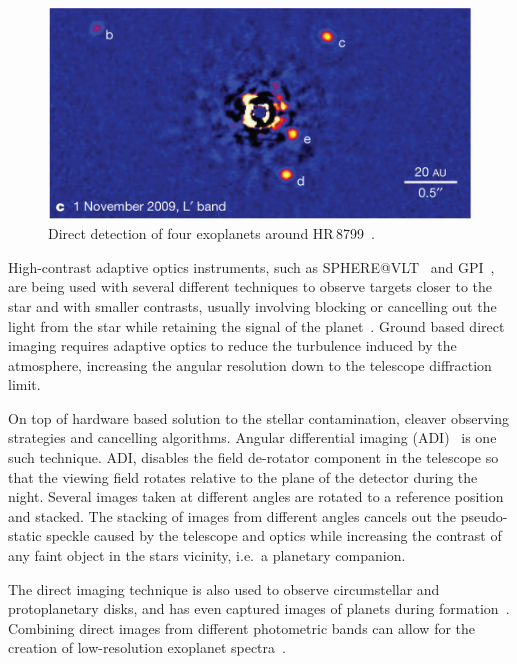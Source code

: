 \begin{figure}
    \centering
    \includegraphics[width=0.5\linewidth]{./figures/introduction/DirectImaging_HR8799_MaroisEtAl2010}
    \caption[Direct detection of four exoplanets around HR\,8799.]{Direct detection of four exoplanets around HR\,8799~\citep{marois_images_2010}.}
    \label{fig:directimaging}
\end{figure}

High-contrast adaptive optics instruments, such as SPHERE@VLT~\citep{beuzit_sphere_2008} and GPI~\citep{macintosh_gemini_2008}, are being used with several different techniques to observe targets closer to the star and with smaller contrasts, usually involving blocking or cancelling out the light from the star while retaining the signal of the planet~\citep[e.g.][]{marois_direct_2005, mawet_annular_2005, schmid_zimpol_2005, sirbu_prospects_2017, sirbu_techniques_2017, wang_observing_2017}.
Ground based direct imaging requires adaptive optics to reduce the turbulence induced by the atmosphere, increasing the angular resolution down to the telescope diffraction limit.

On top of hardware based solution to the stellar contamination, cleaver observing strategies and cancelling algorithms.
Angular differential imaging (ADI)~\citep[eg.][]{marois_direct_2005} is one such technique.
ADI, disables the field de-rotator component in the telescope so that the viewing field rotates relative to the plane of the detector during the night.
Several images taken at different angles are rotated to a reference position and stacked.
The stacking of images from different angles cancels out the pseudo-static speckle caused by the telescope and optics while increasing the contrast of any faint object in the stars vicinity, i.e.\ a planetary companion.

The direct imaging technique is also used to observe circumstellar and protoplanetary disks, and has even captured images of planets during formation~\citep[e.g.][]{sallum_accreting_2015}.
Combining direct images from different photometric bands can allow for the creation of low-resolution exoplanet spectra~\citep[e.g.][]{kuzuhara_direct_2013, zurlo_new_2015}.


